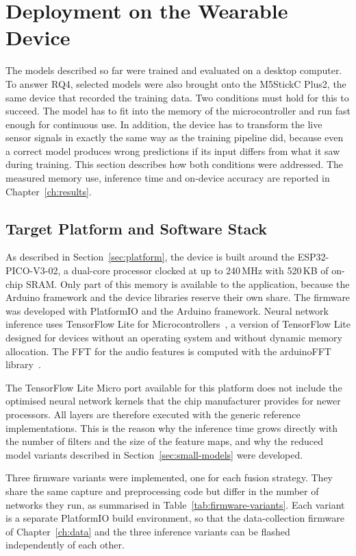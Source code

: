 \section{Deployment on the Wearable Device}
\label{sec:deployment}

The models described so far were trained and evaluated on a desktop computer. To
answer RQ4, selected models were also brought onto the M5StickC Plus2, the same
device that recorded the training data. Two conditions must hold for this to
succeed. The model has to fit into the memory of the microcontroller and run fast
enough for continuous use. In addition, the device has to transform the live
sensor signals in exactly the same way as the training pipeline did, because even
a correct model produces wrong predictions if its input differs from what it saw
during training. This section describes how both conditions were addressed. The
measured memory use, inference time and on-device accuracy are reported in
Chapter~\ref{ch:results}.

\subsection{Target Platform and Software Stack}
\label{sec:platform-sw}

As described in Section~\ref{sec:platform}, the device is built around the
ESP32-PICO-V3-02, a dual-core processor clocked at up to 240\,MHz with 520\,KB of
on-chip SRAM. Only part of this memory is available to the application, because
the Arduino framework and the device libraries reserve their own share. The
firmware was developed with PlatformIO and the Arduino framework. Neural network
inference uses TensorFlow Lite for Microcontrollers~\cite{david2021tflm}, a
version of
TensorFlow Lite designed for devices without an operating system and without
dynamic memory allocation. The FFT for the audio features is computed with the
arduinoFFT library~\cite{arduinofft}.

The TensorFlow Lite Micro port available for this platform does not include the
optimised neural network kernels that the chip manufacturer provides for newer
processors. All layers are therefore executed with the generic reference
implementations. This is the reason why the inference time grows directly with
the number of filters and the size of the feature maps, and why the reduced model
variants described in Section~\ref{sec:small-models} were developed.

Three firmware variants were implemented, one for each fusion strategy. They share
the same capture and preprocessing code but differ in the number of networks they
run, as summarised in Table~\ref{tab:firmware-variants}. Each variant is a separate
PlatformIO build environment, so that the data-collection firmware of
Chapter~\ref{ch:data} and the three inference variants can be flashed
independently of each other.

